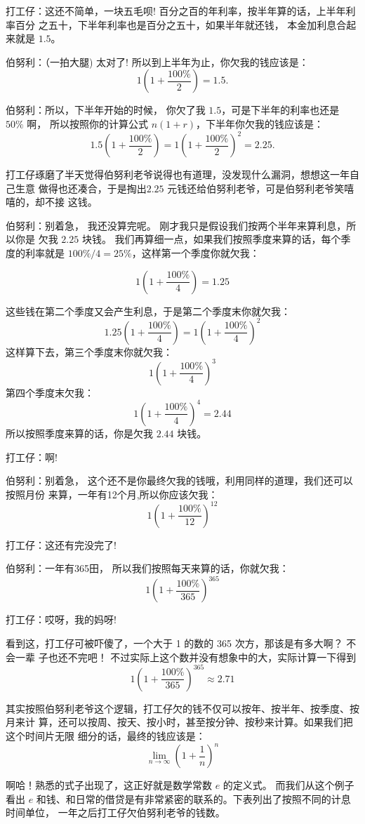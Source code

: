打工仔：这还不简单，一块五毛呗!  百分之百的年利率，按半年算的话，上半年利率百分
之五十，下半年利率也是百分之五十，如果半年就还钱， 本金加利息合起来就是 $1.5$。

伯努利：（一拍大腿) 太对了!  所以到上半年为止，你欠我的钱应该是：
$$ 1 (1+ \frac {100\%} {2})=1.5 . $$

伯努利：所以，下半年开始的时候， 你欠了我 $1.5$，可是下半年的利率也还是 $50\%$ 啊， 
所以按照你的计算公式 $n(1+r)$，下半年你欠我的钱应该是：
$$ 1.5(1+ \frac {100\%} {2} ) = 1(1+ \frac {100\%} {2})^2 = 2.25 .$$

打工仔琢磨了半天觉得伯努利老爷说得也有道理，没发现什么漏洞，想想这一年自己生意
做得也还凑合，于是掏出$2.25$ 元钱还给伯努利老爷，可是伯努利老爷笑嘻嘻的，却不接
这钱。 

伯努利：别着急， 我还没算完呢。 刚才我只是假设我们按两个半年来算利息，所以你是
欠我 $2.25$ 块钱。 我们再算细一点，如果我们按照季度来算的话，每个季度的利率就是
$ 100\% / 4 = 25\% $，这样第一个季度你就欠我：

$$ 1(1+ \frac {100\%} {4}) = 1.25 $$

这些钱在第二个季度又会产生利息，于是第二个季度末你就欠我：
$$ 1.25(1+ \frac {100\%} {4}) = 1(1+ \frac {100\%} {4})^2 $$
这样算下去，第三个季度末你就欠我：
$$ 1(1+ \frac {100\%} {4})^3 $$
第四个季度末欠我：
$$ 1(1+ \frac {100\%} {4})^4 = 2.44 $$
所以按照季度来算的话，你是欠我 $2.44$ 块钱。 

打工仔：啊!

伯努利：别着急， 这个还不是你最终欠我的钱哦，利用同样的道理，我们还可以按照月份
来算，一年有12个月,所以你应该欠我：
$$ 1(1+ \frac {100\%} {12})^{12} $$

打工仔：这还有完没完了!

伯努利：一年有365田， 所以我们按照每天来算的话，你就欠我：
$$ 1(1+ \frac {100\%} {365})^{365} $$

打工仔：哎呀，我的妈呀!

看到这，打工仔可被吓傻了，一个大于 1 的数的 365 次方，那该是有多大啊？ 不会一辈
子也还不完吧！ 不过实际上这个数并没有想象中的大，实际计算一下得到
$$ 1(1+ \frac {100\%} {365})^{365} \approx 2.71$$

其实按照伯努利老爷这个逻辑，打工仔欠的钱不仅可以按年、按半年、按季度、按月来计
算，还可以按周、按天、按小时，甚至按分钟、按秒来计算。如果我们把这个时间片无限
细分的话，最终的钱应该是：
$$ \lim_{n \to \infty}(1+\frac{1}{n})^n$$

啊哈！熟悉的式子出现了，这正好就是数学常数 $e$ 的定义式。 而我们从这个例子看出
$e$ 和钱、和日常的借贷是有非常紧密的联系的。下表列出了按照不同的计息时间单位，
一年之后打工仔欠伯努利老爷的钱数。

